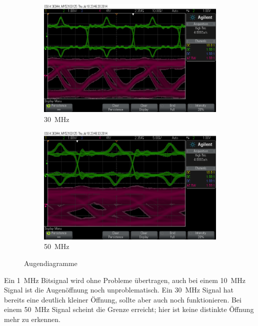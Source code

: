 \documentclass[12pt,a4paper]{article}
\begin{document}
\begin{figure}[!h]
  \centering
  \begin{subfigure}[b]{0.6\textwidth}
    \includegraphics[width=\textwidth]{../measurements/20140710/eye_plots/30MHz.png}
    \caption{\SI{30}{\mega\hertz}}
  \end{subfigure}  
  \begin{subfigure}[b]{0.6\textwidth}
    \includegraphics[width=\textwidth]{../measurements/20140710/eye_plots/50MHz.png}
    \caption{\SI{50}{\mega\hertz}}
  \end{subfigure}  
  \caption{Augendiagramme}
  \label{fig:eye_plots_fast}
\end{figure}



Ein \SI{1}{\mega\hertz} Bitsignal wird ohne Probleme übertragen, auch bei einem \SI{10}{\mega\hertz} Signal ist die Augenöffnung noch unproblematisch. Ein \SI{30}{\mega\hertz} Signal hat bereits eine deutlich kleiner Öffnung, sollte aber auch noch funktionieren. Bei einem \SI{50}{\mega\hertz} Signal scheint die Grenze erreicht; hier ist keine distinkte Öffnung mehr zu erkennen. 
\end{document}
